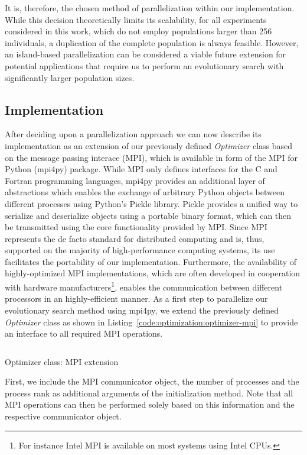 It is, therefore, the chosen method of parallelization within our implementation.
While this decision theoretically limits its scalability, for all experiments considered in this work, which do not employ populations larger than 256 individuals, a duplication of the complete population is always feasible.
However, an island-based parallelization can be considered a viable future extension for potential applications that require us to perform an evolutionary search with significantly larger population sizes.

\subsection{Implementation}
After deciding upon a parallelization approach we can now describe its implementation as an extension of our previously defined \emph{Optimizer} class based on the message passing interace (MPI), which is available in form of the MPI for Python (mpi4py) package.
While MPI only defines interfaces for the C and Fortran programming languages, mpi4py provides an additional layer of abstractions which enables the exchange of arbitrary Python objects between different processes using Python's Pickle library.
Pickle provides a unified way to serialize and deserialize objects using a portable binary format, which can then be transmitted using the core functionality provided by MPI.
Since MPI represents the de facto standard for distributed computing and is, thus, supported on the majority of high-performance computing systems, its use facilitates the portability of our implementation.
Furthermore, the availability of highly-optimized MPI implementations, which are often developed in cooperation with hardware manufacturers\footnote{For instance Intel MPI is available on most systems using Intel CPUs.}, enables the communication between different processors in an highly-efficient manner.
As a first step to parallelize our evolutionary search method using mpi4py, we extend the previously defined \emph{Optimizer} class as shown in Listing~\ref{code:optimization:optimizer-mpi} to provide an interface to all required MPI operations. 
\begin{listing}
	\inputminted[linenos]{python}{evostencils/optimization/optimizer_mpi.py}
	\caption{Optimizer class: MPI extension}
	\label{code:optimization:optimizer-mpi}
\end{listing}
First, we include the MPI communicator object, the number of processes and the process rank as additional arguments of the initialization method.
Note that all MPI operations can then be performed solely based on this information and the respective communicator object.
